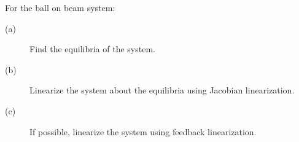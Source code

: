 For the ball on beam system:
    \begin{description}
    \item[(a)] Find the equilibria of the system.
    \item[(b)] Linearize the system about the equilibria using Jacobian linearization.
    \item[(c)] If possible, linearize the system using feedback linearization.
    \end{description}

